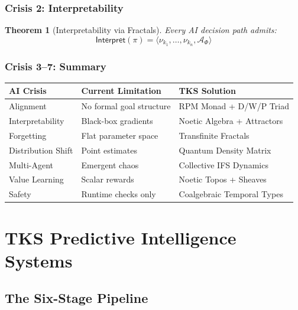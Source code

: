 \documentclass[11pt,twoside]{book}
\newcommand{\noe}[1]{\nu_{#1}}
\newcommand{\FractalAttractor}{\mathcal{A}_\Phi}
\newcommand{\Interpret}{\mathsf{Interpret}}
\theoremstyle{definition}
\theoremstyle{plain}
\newtheorem{theorem}[definition]{Theorem}
\theoremstyle{remark}
\begin{document}
\section{Crisis 2: Interpretability}

\begin{theorem}[Interpretability via Fractals]
Every AI decision path admits:
\begin{equation}
\boxed{
\Interpret(\pi) = \langle \noe{k_1}, \ldots, \noe{k_n}, \FractalAttractor \rangle
}
\end{equation}
\end{theorem}

\section{Crisis 3--7: Summary}

\begin{center}
\begin{tabularx}{\textwidth}{|l|X|X|}
\hline
\textbf{AI Crisis} & \textbf{Current Limitation} & \textbf{TKS Solution} \\
\hline
Alignment & No formal goal structure & RPM Monad + D/W/P Triad \\
\hline
Interpretability & Black-box gradients & Noetic Algebra + Attractors \\
\hline
Forgetting & Flat parameter space & Transfinite Fractals \\
\hline
Distribution Shift & Point estimates & Quantum Density Matrix \\
\hline
Multi-Agent & Emergent chaos & Collective IFS Dynamics \\
\hline
Value Learning & Scalar rewards & Noetic Topos + Sheaves \\
\hline
Safety & Runtime checks only & Coalgebraic Temporal Types \\
\hline
\end{tabularx}
\end{center}

\part{TKS Predictive Intelligence Systems}

\chapter{The Six-Stage Pipeline}
\label{ch:predictive-pipeline}
\end{document}
